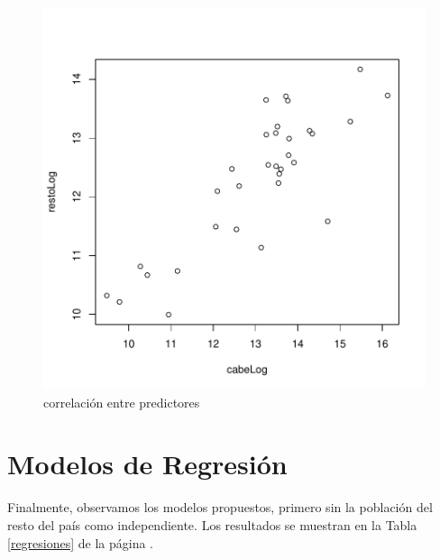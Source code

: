 \documentclass{article}
\begin{document}
\begin{figure}[h]
\centering
\begin{adjustbox}{width=7cm,height=7cm,clip,trim=1cm 0.5cm 0cm 1cm}
\includegraphics{Proyecto_final-corrPlot}
\end{adjustbox}
\caption{correlaci\'on entre predictores}
\label{corrPlot}
\end{figure}
\clearpage

\section{Modelos de Regresi\'on}
Finalmente, observamos los modelos propuestos, primero sin la poblaci\'on del resto del pa\'is como independiente. Los resultados se muestran en la Tabla \ref{regresiones} de la p\'agina \pageref{regresiones}.
\end{document}
